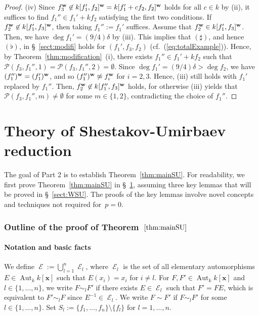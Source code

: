 \documentclass{amsart}
\theoremstyle{plain}
\theoremstyle{definition}
\newcommand{\E }{{\mathop{\mathcal{E}}\nolimits}}
\newcommand{\sm}{\setminus}
\newcommand{\Aut }{\mathop{\mathrm{Aut}}\nolimits}
\newcommand{\x}{{\boldsymbol x}}
\newcommand{\w}{{\bf w}}
\newcommand{\kx}{k[\x]}
\begin{document}
\begin{proof}
(iv) 
Since 
$f_3^{\w }\not\in k[f_1',f_2]^{\w }=k[f_1'+cf_2,f_2]^{\w }$ 
holds for all $c\in k$ by (ii), 
it suffices to find $f_1''\in f_1'+kf_2$ 
satisfying the first two conditions. 
If $f_2^{\w }\not\in k[f_1',f_3]^{\w }$, 
then taking $f_1'':=f_1'$ suffices. 
Assume that $f_2^{\w }\in k[f_1',f_3]^{\w }$. 
Then, we have $\deg f_1'=(9/4)\delta $ by (iii). 
This implies that $(\sharp )$, 
and hence $(\flat )$, in \S~\ref{sect:modifi} 
holds for $(f_1',f_3,f_2)$ 
(cf.\ (\ref{eq:totalExample})). 
Hence, 
by Theorem~\ref{thm:modification}~(i), 
there exists $f_1''\in f_1'+kf_2$ 
such that 
$\mathcal{P}(f_3,f_1'',1)=\mathcal{P}(f_3,f_1'',2)=\emptyset $. 
Since $\deg f_1'=(9/4)\delta >\deg f_2$, 
we have $(f_1'')^{\w }=(f_1')^{\w }$, 
and so $(f_1'')^{\w }\not\approx f_i^{\w }$ for $i=2,3$. 
Hence, 
(iii) still holds with $f_1'$ replaced by $f_1''$. 
Then, $f_2^{\w }\not\in k[f_1'',f_3]^{\w }$ holds, 
for otherwise (iii) yields that 
$\mathcal{P}(f_3,f_1'',m)\ne \emptyset $ 
for some $m\in \{ 1,2\} $, 
contradicting the choice of $f_1''$. 
\end{proof}



\part{Theory of Shestakov-Umirbaev reduction} 



The goal of Part 2 is to establish Theorem~\ref{thm:mainSU}. 
For readability, 
we first prove Theorem~\ref{thm:mainSU} in \S~\ref{sect:proof}, 
assuming three key lemmas that will be 
proved in \S ~\ref{sect:WSU}. 
The proofs of the key lemmas 
involve novel concepts and techniques 
not required for~$p=0$. 




\section{Outline of the proof of Theorem~$\ref{thm:mainSU}$}\label{sect:proof}
\setcounter{equation}{0}


\subsection{Notation and basic facts}


We define 
$\E :=\bigcup _{l=1}^n\E _l$, 
where $\E _l$ is the set of all elementary 
automorphisms $E\in \Aut _k\kx $ such that $E(x_i)=x_i$ for $i\ne l$. 
For $F,F'\in \Aut _k\kx $ and $l\in \{ 1,\ldots ,n\} $, 
we write $F\sim _lF'$ 
if there exists $E\in \E _l$ such that $F'=FE$, 
which is equivalent to $F'\sim _lF$ since $E^{-1}\in \E _l$. 
We write $F\sim F'$ if $F\sim _lF'$ 
for some $l\in \{ 1,\ldots ,n\} $. 
Set $S_l:=\{ f_1,\ldots ,f_n\} \sm \{ f_l\} $ 
for $l=1,\ldots ,n$. 
\end{document}
